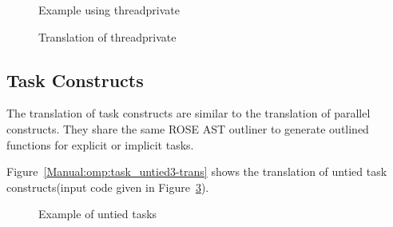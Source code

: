 \lstset{language=C,basicstyle=\scriptsize}
\begin{figure}[htbp]
{\indent
  {\mySmallFontSize
    \begin{latexonly}
    
    \end{latexonly}
    \begin{htmlonly}
    
    \end{htmlonly}
  }
}
\caption{Example using threadprivate}
\label{Manual:omp:threadprivate}
\end{figure}

\begin{figure}[htbp]
{\indent
  {\mySmallFontSize
    \begin{latexonly}
    
    \end{latexonly}
    \begin{htmlonly}
    
    \end{htmlonly}
  }
}
\caption{Translation of threadprivate}
\label{Manual:omp:threadprivate-trans}
\end{figure}


\clearpage
\subsection{Task Constructs}
The translation of task constructs are similar to the translation of parallel constructs. 
They share the same ROSE AST outliner to generate outlined functions for
explicit or implicit tasks.

Figure~\ref{Manual:omp:task_untied3-trans} shows the translation of untied task constructs(input code given in
Figure~\ref{Manual:omp:task_untied3}). 

\lstset{language=C,basicstyle=\scriptsize}
\begin{figure}[htbp]
{\indent
  {\mySmallFontSize
    \begin{latexonly}
    
    \end{latexonly}
    \begin{htmlonly}
    
    \end{htmlonly}
  }
}
\caption{Example of untied tasks}
\label{Manual:omp:task_untied3}
\end{figure}

